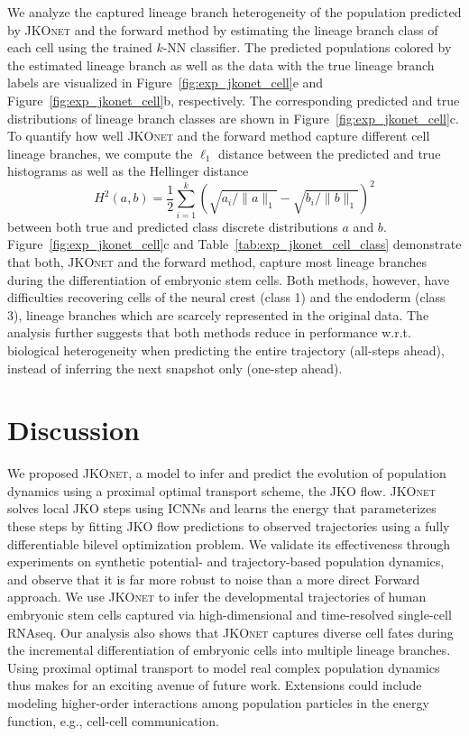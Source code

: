 We analyze the captured lineage branch heterogeneity of the population predicted by \textsc{JKOnet} and the forward method by estimating the lineage branch class of each cell using the trained $k$-NN classifier. The predicted populations colored by the estimated lineage branch as well as the data with the true lineage branch labels are visualized in Figure~\ref{fig:exp_jkonet_cell}e and Figure~\ref{fig:exp_jkonet_cell}b, respectively.
The corresponding predicted and true distributions of lineage branch classes are shown in Figure~\ref{fig:exp_jkonet_cell}c.
To quantify how well \textsc{JKOnet} and the forward method capture  different cell lineage branches, we compute the $\ell_1$ distance between the  predicted and true histograms as well as the Hellinger distance 
\begin{equation} \label{eq:hellinger}
    H^2(a, b)=\frac{1}{2} \sum_{i=1}^{k}\left(\sqrt{a_{i}/\|a\|_1}-\sqrt{b_{i}/\|b\|_1}\right)^{2}
\end{equation}
between both true and predicted class discrete distributions $a$ and $b$.
Figure~\ref{fig:exp_jkonet_cell}c and Table~\ref{tab:exp_jkonet_cell_class} demonstrate that both, \textsc{JKOnet} and the forward method, capture most lineage branches during the differentiation of embryonic stem cells. Both methods, however, have difficulties recovering cells of the neural crest (class 1) and the endoderm (class 3), lineage branches which are scarcely represented in the original data. 
The analysis further suggests that both methods reduce in performance w.r.t. biological heterogeneity when predicting the entire trajectory (all-steps ahead), instead of inferring the next snapshot only (one-step ahead).


\section{Discussion}
We proposed \textsc{JKOnet}, a model to infer and predict the evolution of population dynamics using a proximal optimal transport scheme, the JKO flow.
\textsc{JKOnet} solves local JKO steps using ICNNs and learns the energy that parameterizes these steps by fitting JKO flow predictions to observed trajectories using a fully differentiable bilevel optimization problem.
We validate its effectiveness through experiments on synthetic potential- and trajectory-based population dynamics, and observe that it is far more robust to noise than a more direct Forward approach. We use \textsc{JKOnet} to infer the developmental trajectories of human embryonic stem cells captured via high-dimensional and time-resolved single-cell RNAseq. 
Our analysis also shows that \textsc{JKOnet} captures diverse cell fates during the incremental differentiation of embryonic cells into multiple lineage branches.
Using proximal optimal transport to model real complex population dynamics thus makes for an exciting avenue of future work. Extensions could include modeling higher-order interactions among population particles in the energy function, e.g., cell-cell communication.
